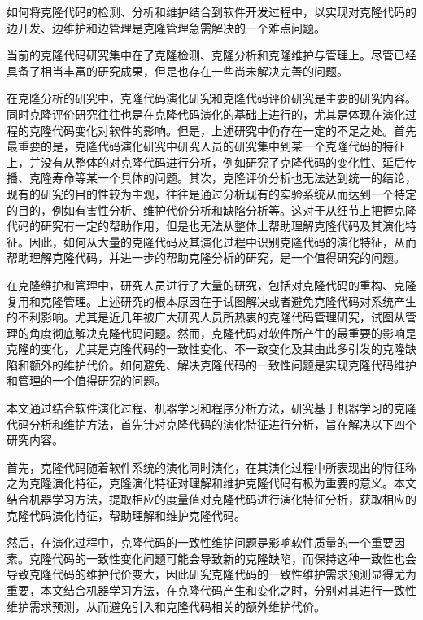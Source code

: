 如何将克隆代码的检测、分析和维护结合到软件开发过程中，以实现对克隆代码的边开发、边维护和边管理是克隆管理急需解决的一个难点问题。


当前的克隆代码研究集中在了克隆检测、克隆分析和克隆维护与管理上。尽管已经具备了相当丰富的研究成果，但是也存在一些尚未解决完善的问题。

在克隆分析的研究中，克隆代码演化研究和克隆代码评价研究是主要的研究内容。同时克隆评价研究往往也是在克隆代码演化的基础上进行的，尤其是体现在演化过程的克隆代码变化对软件的影响。但是，上述研究中仍存在一定的不足之处。首先最重要的是，克隆代码演化研究中研究人员的研究集中到某一个克隆代码的特征上，并没有从整体的对克隆代码进行分析，例如研究了克隆代码的变化性、延后传播、克隆寿命等某一个具体的问题。其次，克隆评价分析也无法达到统一的结论，现有的研究的目的性较为主观，往往是通过分析现有的实验系统从而达到一个特定的目的，例如有害性分析、维护代价分析和缺陷分析等。这对于从细节上把握克隆代码的研究有一定的帮助作用，但是也无法从整体上帮助理解克隆代码及其演化特征。因此，如何从大量的克隆代码及其演化过程中识别克隆代码的演化特征，从而帮助理解克隆代码，并进一步的帮助克隆分析的研究，是一个值得研究的问题。


在克隆维护和管理中，研究人员进行了大量的研究，包括对克隆代码的重构、克隆复用和克隆管理。上述研究的根本原因在于试图解决或者避免克隆代码对系统产生的不利影响。尤其是近几年被广大研究人员所热衷的克隆代码管理研究，试图从管理的角度彻底解决克隆代码问题。然而，克隆代码对软件所产生的最重要的影响是克隆的变化，尤其是克隆代码的一致性变化、不一致变化及其由此多引发的克隆缺陷和额外的维护代价。如何避免、解决克隆代码的一致性问题是实现克隆代码维护和管理的一个值得研究的问题。



本文通过结合软件演化过程、机器学习和程序分析方法，研究基于机器学习的克隆代码分析和维护方法，首先针对克隆代码的演化特征进行分析，旨在解决以下四个研究内容。

首先，克隆代码随着软件系统的演化同时演化，在其演化过程中所表现出的特征称之为克隆演化特征，克隆演化特征对理解和维护克隆代码有极为重要的意义。本文结合机器学习方法，提取相应的度量值对克隆代码进行演化特征分析，获取相应的克隆代码演化特征，帮助理解和维护克隆代码。

然后，在演化过程中，克隆代码的一致性维护问题是影响软件质量的一个重要因素。克隆代码的一致性变化问题可能会导致新的克隆缺陷，而保持这种一致性也会导致克隆代码的维护代价变大，因此研究克隆代码的一致性维护需求预测显得尤为重要，本文结合机器学习方法，在克隆代码产生和变化之时，分别对其进行一致性维护需求预测，从而避免引入和克隆代码相关的额外维护代价。

